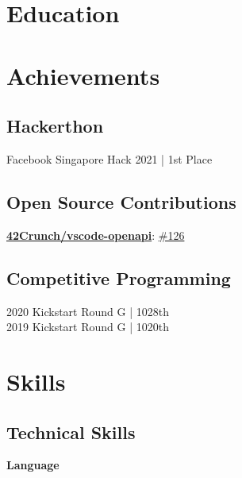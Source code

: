 \documentclass[]{Klement_Resume}
\begin{document}
\begin{minipage}[t]{0.33\textwidth} 


\section{Education} 

\sectionsep

\section{Achievements}
\subsection{Hackerthon}
Facebook Singapore Hack 2021 | 1st Place
\subsection{Open Source Contributions}
\href{https://github.com/42Crunch/vscode-openapi}{\bf 42Crunch/vscode-openapi}: \href{https://github.com/42Crunch/vscode-openapi/pull/126}{\#126}
\sectionsep
\subsection{Competitive Programming}
2020 Kickstart Round G | 1028th \\
2019 Kickstart Round G | 1020th\\
\sectionsep



\section{Skills}
\subsection{Technical Skills}

{\bf Language}


\end{minipage}
\end{document}
